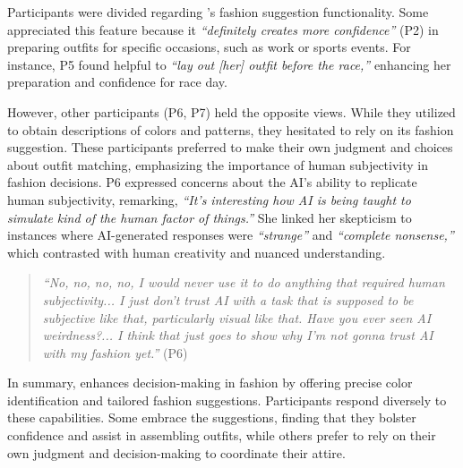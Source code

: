 

Participants were divided regarding \bma's fashion suggestion functionality. Some appreciated this feature because it \textit{``definitely creates more confidence''} (P2) in preparing outfits for specific occasions, such as work or sports events. For instance, P5 found \bma{} helpful to \textit{``lay out [her] outfit before the race,''} enhancing her preparation and confidence for race day. 



However, other participants (P6, P7) held the opposite views. 
While they utilized \bma{} to obtain descriptions of colors and patterns, they hesitated to rely on its fashion suggestion. These participants preferred to make their own judgment and choices about outfit matching, emphasizing the importance of human subjectivity in fashion decisions. 
% 
P6 expressed concerns about the AI's ability to replicate human subjectivity, remarking, \textit{``It's interesting how AI is being taught to simulate kind of the human factor of things.''}
% 
She linked her skepticism to instances where AI-generated responses were \textit{``strange''} and \textit{``complete nonsense,''} which contrasted with human creativity and nuanced understanding. 



\begin{quote}
    \textit{``No, no, no, no, I would never use it to do anything that required human subjectivity... I just don't trust AI with a task that is supposed to be subjective like that, particularly visual like that. Have you ever seen AI weirdness?... I think that just goes to show why I'm not gonna trust AI with my fashion yet.''} (P6)
\end{quote}




In summary, \bma{} enhances decision-making in fashion by offering precise color identification and tailored fashion suggestions. Participants respond diversely to these capabilities. Some embrace the suggestions, finding that they bolster confidence and assist in assembling outfits, while others prefer to rely on their own judgment and decision-making to coordinate their attire.




